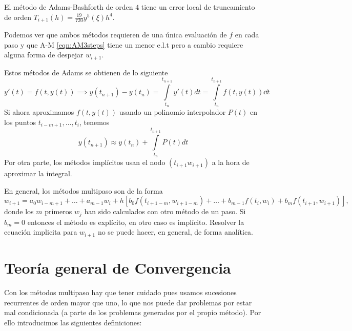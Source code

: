 \begin{proposition}
    El método de Adams-Bashforth de orden $4$
    tiene un error local de truncamiento
    de orden $T_{i+1}(h) = \frac{19}{720}y^5(\xi)h^4$.
\end{proposition}

Podemos ver que ambos métodos requieren de una única evaluación de $f$
en cada paso y que A-M \ref{eqn:AM3steps} tiene un menor e.l.t pero a cambio
requiere alguna forma de despejar $w_{i+1}$.

\begin{remark}
    Estos métodos de Adams se obtienen de lo siguiente
    \begin{equation*}
        y'(t) = f(t,y(t)) \implies
        y(t_{n+1}) - y(t_n) =
        \int\limits_{t_n}^{t_{n+1}} y'(t)dt =
        \int\limits_{t_n}^{t_{n+1}} f(t,y(t)) \dd t
    \end{equation*}
    Si ahora aproximamos $f(t,y(t))$ usando un polinomio interpolador $P(t)$
    en los puntos $t_{i-m+1},\dots,t_i$, tenemos
    \begin{equation*}
        y(t_{n+1}) \approx y(t_n) + \int\limits_{t_n}^{t_{n+1}} P(t)dt
    \end{equation*}
    Por otra parte, los métodos implícitos usan el nodo $(t_{i+1}w_{i+1})$
    a la hora de aproximar la integral.
\end{remark}

En general, los métodos multipaso son de la forma
\begin{equation*}
    w_{i+1} = a_0w_{i-m+1} + \dots + a_{m-1}w_i + h[
        b_0f(t_{i+1-m},w_{i+1-m}) + \dots + b_{m-1}f(t_i,w_i)
        + b_mf(t_{i+1},w_{i+1})
    ],
\end{equation*}
donde los $m$ primeros $w_j$ han sido calculados con otro método de un paso.
Si $b_m = 0$ entonces el método es explícito, en otro caso es implícito.
Resolver la ecuación implicita para $w_{i+1}$ no se puede hacer, en general,
de forma analítica.

\section{Teoría general de Convergencia}

Con los métodos multipaso hay que tener cuidado pues usamos
sucesiones recurrentes de orden mayor que uno,
lo que nos puede dar problemas por estar mal condicionada
(a parte de los problemas generados por el propio método).
Por ello introducimos las siguientes definiciones:

